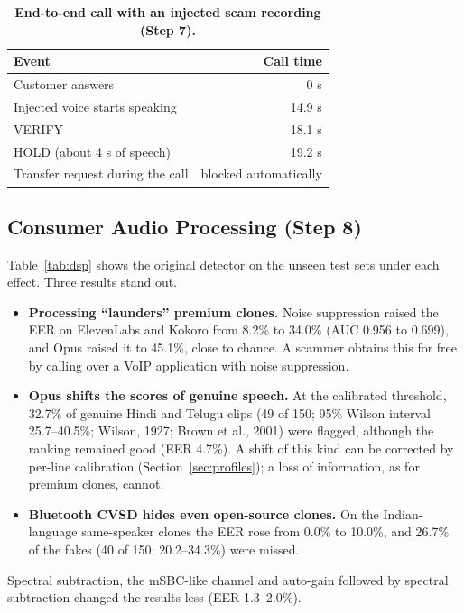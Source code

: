 \documentclass[10pt,a4paper,twocolumn]{article}
\begin{document}
\begin{table}[t]
\centering\footnotesize
\caption{\textbf{End-to-end call with an injected scam recording (Step 7).}}
\label{tab:e2e}
\begin{tabular}{@{}p{}r@{}}
\toprule
\textbf{Event} & \textbf{Call time}\\
\midrule
Customer answers & 0 s\\
Injected voice starts speaking & 14.9 s\\
VERIFY & 18.1 s\\
HOLD (about 4 s of speech) & 19.2 s\\
Transfer request during the call & blocked automatically\\
\bottomrule
\end{tabular}
\end{table}

\subsection{Consumer Audio Processing (Step 8)}
\label{sec:dspres}
Table~\ref{tab:dsp} shows the original detector on the unseen test sets under each effect. Three results stand out.
\begin{itemize}\setlength\itemsep{0pt}
\item \textbf{Processing ``launders'' premium clones.} Noise suppression raised the EER on ElevenLabs and Kokoro from 8.2\% to 34.0\% (AUC 0.956 to 0.699), and Opus raised it to 45.1\%, close to chance. A scammer obtains this for free by calling over a VoIP application with noise suppression.
\item \textbf{Opus shifts the scores of genuine speech.} At the calibrated threshold, 32.7\% of genuine Hindi and Telugu clips (49 of 150; 95\% Wilson interval 25.7--40.5\%; Wilson, 1927; Brown et al., 2001) were flagged, although the ranking remained good (EER 4.7\%). A shift of this kind can be corrected by per-line calibration (Section~\ref{sec:profiles}); a loss of information, as for premium clones, cannot.
\item \textbf{Bluetooth CVSD hides even open-source clones.} On the Indian-language same-speaker clones the EER rose from 0.0\% to 10.0\%, and 26.7\% of the fakes (40 of 150; 20.2--34.3\%) were missed.
\end{itemize}
Spectral subtraction, the mSBC-like channel and auto-gain followed by spectral subtraction changed the results less (EER 1.3--2.0\%).
\end{document}
